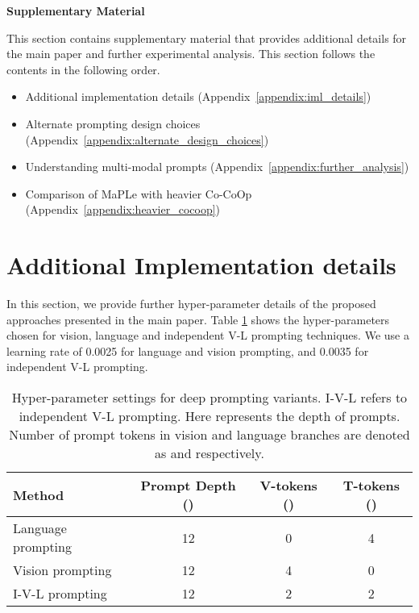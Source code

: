 \documentclass[10pt,twocolumn,letterpaper]{article}
\newcommand{\tablestyle}[2]{\setlength{\tabcolsep}{#1}\renewcommand{\arraystretch}{#2}\centering\footnotesize}
\begin{document}
{\small


}


\newpage
\newpage
\appendix


\begin{center}
\textbf{\Large Supplementary Material}
\end{center}

 \noindent This section contains supplementary material that provides additional details for the main paper and further experimental analysis. This section follows the contents in the following order.
\begin{itemize}
    \item Additional implementation details (Appendix~\ref{appendix:iml_details})
    \item Alternate prompting design choices (Appendix~\ref{appendix:alternate_design_choices})
    \item Understanding multi-modal prompts (Appendix~\ref{appendix:further_analysis})

\item Comparison of MaPLe with heavier Co-CoOp (Appendix~\ref{appendix:heavier_cocoop})
\end{itemize}


\section{Additional Implementation details}
 \noindent In this section, we provide further hyper-parameter details of the proposed approaches presented in the main paper. Table \ref{table:hyper_parameter} shows the hyper-parameters chosen for vision, language and independent V-L prompting techniques. We use a learning rate of 0.0025 for language and vision prompting, and 0.0035 for independent V-L prompting.
\label{appendix:iml_details}


\begin{table}[h!]
\tablestyle{6pt}{1.1}
\addtolength{\tabcolsep}{-3pt}
\begin{tabular}{l ccc}
\toprule
Method  & Prompt Depth () & V-tokens () & T-tokens ()\\
\midrule
Language prompting &	12 & 0 &	4\\
Vision prompting & 12 & 4 & 0\\
I-V-L prompting & 12 & 2 & 2\\
\bottomrule
\end{tabular}
\caption{
Hyper-parameter settings for deep prompting variants. I-V-L refers to independent V-L prompting. Here  represents the depth of prompts. Number of prompt tokens in vision and language branches are denoted as  and  respectively.
} 
\label{table:hyper_parameter}
\end{table}
\end{document}
